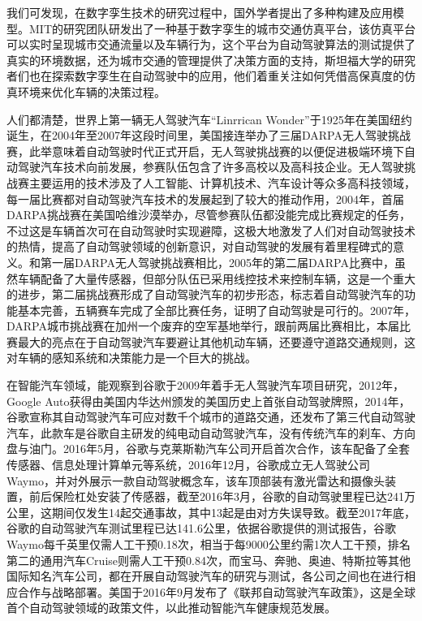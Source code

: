 我们可发现，在数字孪生技术的研究过程中，国外学者提出了多种构建及应用模型。MIT的研究团队研发出了一种基于数字孪生的城市交通仿真平台，该仿真平台可以实时呈现城市交通流量以及车辆行为，这个平台为自动驾驶算法的测试提供了真实的环境数据，还为城市交通的管理提供了决策方面的支持，斯坦福大学的研究者们也在探索数字孪生在自动驾驶中的应用，他们着重关注如何凭借高保真度的仿真环境来优化车辆的决策过程。

人们都清楚，世界上第一辆无人驾驶汽车“Linrrican Wonder”于1925年在美国纽约诞生，在2004年至2007年这段时间里，美国接连举办了三届DARPA无人驾驶挑战赛，此举意味着自动驾驶时代正式开启，无人驾驶挑战赛的以便促进极端环境下自动驾驶汽车技术向前发展，参赛队伍包含了许多高校以及高科技企业。无人驾驶挑战赛主要运用的技术涉及了人工智能、计算机技术、汽车设计等众多高科技领域，每一届比赛都对自动驾驶汽车技术的发展起到了较大的推动作用，2004年，首届DARPA挑战赛在美国哈维沙漠举办，尽管参赛队伍都没能完成比赛规定的任务，不过这是车辆首次可在自动驾驶时实现避障，这极大地激发了人们对自动驾驶技术的热情，提高了自动驾驶领域的创新意识，对自动驾驶的发展有着里程碑式的意义。和第一届DARPA无人驾驶挑战赛相比，2005年的第二届DARPA比赛中，虽然车辆配备了大量传感器，但部分队伍已采用线控技术来控制车辆，这是一个重大的进步，第二届挑战赛形成了自动驾驶汽车的初步形态，标志着自动驾驶汽车的功能基本完善，五辆赛车完成了全部比赛任务，证明了自动驾驶是可行的。2007年，DARPA城市挑战赛在加州一个废弃的空军基地举行，跟前两届比赛相比，本届比赛最大的亮点在于自动驾驶汽车要避让其他机动车辆，还要遵守道路交通规则，这对车辆的感知系统和决策能力是一个巨大的挑战。

在智能汽车领域，能观察到谷歌于2009年着手无人驾驶汽车项目研究，2012年，Google Auto获得由美国内华达州颁发的美国历史上首张自动驾驶牌照，2014年，谷歌宣称其自动驾驶汽车可应对数千个城市的道路交通，还发布了第三代自动驾驶汽车，此款车是谷歌自主研发的纯电动自动驾驶汽车，没有传统汽车的刹车、方向盘与油门。2016年5月，谷歌与克莱斯勒汽车公司开启首次合作，该车配备了全套传感器、信息处理计算单元等系统，2016年12月，谷歌成立无人驾驶公司Waymo，并对外展示一款自动驾驶概念车，该车顶部装有激光雷达和摄像头装置，前后保险杠处安装了传感器，截至2016年3月，谷歌的自动驾驶里程已达241万公里，这期间仅发生14起交通事故，其中13起\cite{janai2020computer}是由对方失误导致。截至2017年底，谷歌的自动驾驶汽车测试里程已达141.6公里，依据谷歌提供的测试报告，谷歌Waymo每千英里仅需人工干预0.18次，相当于每9000公里约需1次人工干预，排名第二的通用汽车Cruise则需人工干预0.84次，而宝马、奔驰、奥迪、特斯拉等其他国际知名汽车公司，都在开展自动驾驶汽车的研究与测试，各公司之间也在进行相应合作与战略部署。美国于2016年9月发布了《联邦自动驾驶汽车政策》，这是全球首个自动驾驶领域的政策文件\cite{陈燕申2017美国政府}，以此推动智能汽车健康规范发展。

